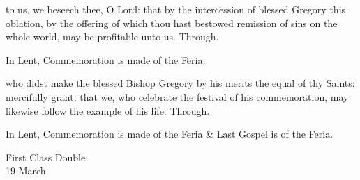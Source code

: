 \secret
{} to us, we beseech thee, O Lord: that by the intercession of blessed Gregory this oblation, by the offering of which thou hast bestowed remission of sins on the whole world, may be profitable unto us. Through.
\begin{rubric}
    In Lent, Commemoration is made of the Feria.%
\end{rubric}
\postcommunion
{} who didst make the blessed Bishop Gregory by his merits the equal of thy Saints: mercifully grant; that we, who celebrate the festival of his commemoration, may likewise follow the example of his life. Through.
\begin{rubric}
    In Lent, Commemoration is made of the Feria \& Last Gospel is of the Feria.
\end{rubric}


\clearpage
{}
\begin{inhead}
    {First Class Double\\
19 March}
\end{inhead}

